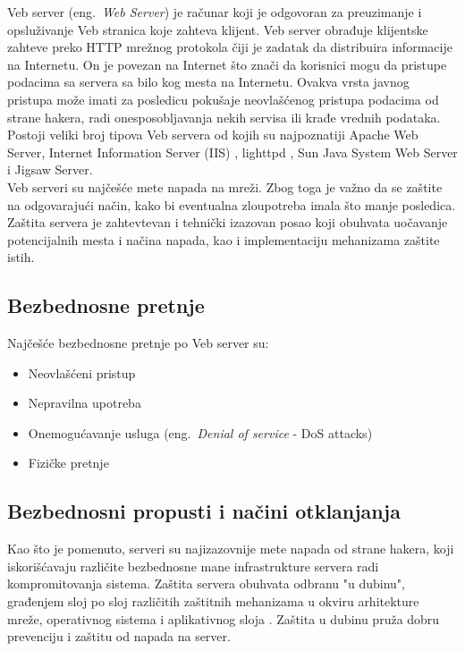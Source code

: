 \documentclass[a4paper]{article}
\begin{document}
Veb server (eng.~{\em Web Server}) je računar koji je odgovoran za preuzimanje i opsluživanje Veb stranica koje zahteva klijent. Veb server obrađuje klijentske zahteve preko HTTP mrežnog protokola čiji je zadatak da distribuira informacije na Internetu. On je povezan na Internet što znači da korisnici mogu da pristupe podacima sa servera sa bilo kog mesta na Internetu. Ovakva vrsta javnog pristupa može imati za posledicu pokušaje neovlašćenog pristupa podacima od strane hakera, radi onesposobljavanja nekih servisa ili krađe vrednih podataka. Postoji veliki broj tipova Veb servera od kojih su najpoznatiji Apache Web Server, Internet Information Server (IIS) , lighttpd , Sun Java System Web Server i Jigsaw Server. \\
\indent Veb serveri su najčešće mete napada na mreži. Zbog toga je važno da se zaštite na odgovarajući način, kako bi eventualna zloupotreba imala što manje posledica. Zaštita servera je zahtevtevan i tehnički izazovan posao koji obuhvata uočavanje potencijalnih mesta i načina napada, kao  i implementaciju mehanizama zaštite istih.  

\subsection{Bezbednosne pretnje }
\label{sec:pretnje}
Najčešće bezbednosne pretnje po Veb server su:
\begin{itemize}
    \item Neovlašćeni pristup
    \item Nepravilna upotreba
    \item Onemogućavanje usluga (eng.~{\em Denial of service} - DoS attacks)
    \item Fizičke pretnje
\end{itemize}

\subsection{Bezbednosni propusti i načini otklanjanja}
\label{sec:propusti}
Kao što je pomenuto, serveri su najizazovnije mete napada od strane hakera, koji iskorišćavaju različite bezbednosne mane infrastrukture servera radi kompromitovanja sistema. Zaštita servera obuhvata odbranu "u dubinu", građenjem sloj po sloj različitih zaštitnih mehanizama u okviru arhitekture mreže, operativnog sistema i aplikativnog sloja  \cite{wssg}. Zaštita u dubinu pruža dobru prevenciju i zaštitu od napada na server.
\end{document}
